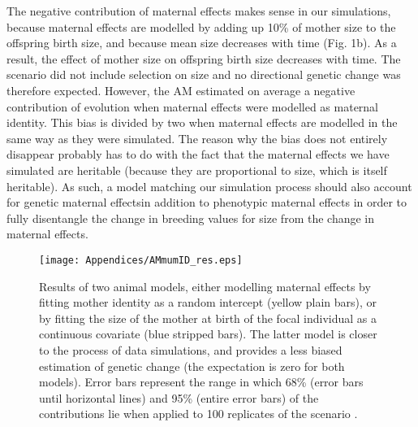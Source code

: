 The negative contribution of maternal effects makes sense in our simulations, because maternal effects are modelled by adding up 10\% of mother size to the offspring birth size, and because mean size decreases with time (Fig. 1b). As a result, the effect of mother size on offspring birth size decreases with time. 
The scenario \sh did not include selection on size and no directional genetic change was therefore expected. However, the AM estimated on average a negative contribution of evolution when maternal effects were modelled as maternal identity. 
This bias is divided by two when maternal effects are modelled in the same way as they were simulated. The reason why the bias does not entirely disappear probably has to do with the fact that the maternal effects we have simulated are heritable (because they are proportional to size, which is itself heritable). As such, a model matching our simulation process should also account for genetic maternal effects\textemdash in addition to phenotypic maternal effects\textemdash \citep{Mcglothlin2014} in order to fully disentangle the change in breeding values for size from the change in maternal effects.

\begin{figure}[ht]
	\texttt{[image: Appendices/AMmumID\_res.eps]}
    \caption{Results of two animal models, either modelling maternal effects by fitting mother identity as a random intercept (yellow plain bars), or by fitting the size of the mother at birth of the focal individual as a continuous covariate (blue stripped bars). The latter model is closer to the process of data simulations, and provides a less biased estimation of genetic change (the expectation is zero for both models). Error bars represent the range in which 68\% (error bars until horizontal lines) and 95\% (entire error bars) of the contributions lie when applied to 100 replicates of the scenario \sh.}
    \label{app:AM:IDvsSize}
\end{figure}